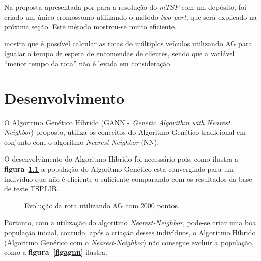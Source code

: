 \documentclass[12pt,openright,a4paper,oneside]{tcc}
\begin{document}
			Na proposta  apresentada por  para a resolução do \textit{mTSP} com um depósito, foi criado um único cromossomo utilizando o método \textit{two-part}, que será explicado na próxima seção. Este método mostrou-se muito eficiente.

			  mostra que é possível calcular as rotas de múltiplos veículos utilizando AG para igualar o tempo 
			de espera de encomendas de clientes, sendo que a variável ``menor tempo da rota'' não é levada em consideração.

		
	
		\chapter{Desenvolvimento}
		
		O Algoritmo Genético Híbrido (GANN - \textit{Genetic Algorithm with Nearest Neighbor}) proposto, utiliza os conceitos do Algoritmo Genético tradicional em conjunto com o algoritmo  \textit{Nearest-Neighbor} (NN).

		O desenvolvimento do Algoritmo Híbrido foi necessário pois, como ilustra a \textbf{figura~\ref{graf-agestag}}  a população do Algoritmo Genético esta convergindo para um indivíduo que não é eficiente o suficiente comparando com os resultados da base de teste TSPLIB.  

		\begin{figure}[h]
			\centering
            \caption{Evolução da rota utilizando AG com 2000 pontos.}
			\label{graf-agestag}
		\end{figure}

		Portanto, com a utilização do algoritmo \textit{Nearest-Neighbor}, pode-se criar uma boa população inicial, contudo, após a criação desses indivíduos, o Algoritmo Híbrido (Algoritmo Genérico com o  \textit{Nearest-Neighbor}) não consegue evoluir a população, como a \textbf{figura~\ref{figagnn}} ilustra.  
\end{document}
